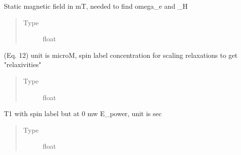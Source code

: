 \documentclass[letterpaper,10pt,english]{sphinxmanual}
\begin{document}
\begin{fulllineitems}
\begin{fulllineitems}
\end{fulllineitems}


\begin{fulllineitems}
\label{\detokenize{dnpHydration:dnpLab.dnpHydration.HydrationParameter.field}}
Static magnetic field in mT, needed to find omega\_e and \_H
\begin{quote}\begin{description}
\item[{Type}] \leavevmode
float

\end{description}\end{quote}

\end{fulllineitems}


\begin{fulllineitems}
\label{\detokenize{dnpHydration:dnpLab.dnpHydration.HydrationParameter.spin_C}}
(Eq. 1\sphinxhyphen{}2) unit is microM, spin label concentration for scaling
relaxations to get "relaxivities"
\begin{quote}\begin{description}
\item[{Type}] \leavevmode
float

\end{description}\end{quote}

\end{fulllineitems}


\begin{fulllineitems}
\label{\detokenize{dnpHydration:dnpLab.dnpHydration.HydrationParameter.T10}}
T1 with spin label but at 0 mw E\_power, unit is sec
\begin{quote}\begin{description}
\item[{Type}] \leavevmode
float


\end{description}
\end{quote}
\end{fulllineitems}
\end{fulllineitems}
\end{document}
